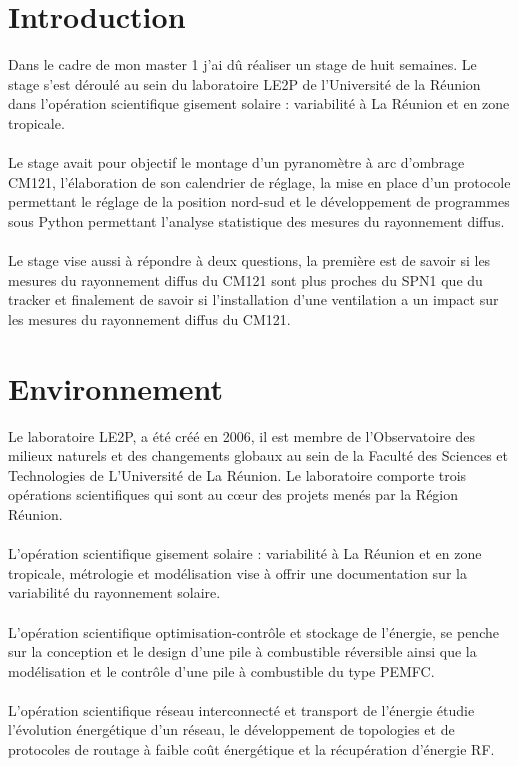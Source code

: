 \documentclass[12pt,a4paper]{article}
\begin{document}
\begin{flushleft}

\justify
\sf
\section{Introduction}

\setcounter{page}{1}

Dans le cadre de mon master 1 j'ai dû réaliser un stage de huit semaines. Le stage s'est déroulé au sein du laboratoire LE2P de l'Université de la Réunion dans l'opération scientifique gisement solaire : variabilité à La Réunion et en zone tropicale.\\
~\\
Le stage avait pour objectif le montage d'un pyranomètre à arc d'ombrage CM121, l'élaboration de son calendrier de réglage, la mise en place d'un protocole permettant le réglage de la position nord-sud et le développement de programmes sous Python permettant l'analyse statistique des mesures du rayonnement diffus.\\
~\\
 Le stage vise aussi à répondre à deux questions, la première est de savoir si les mesures du rayonnement diffus du CM121 sont plus proches  du SPN1 que du tracker et finalement de savoir si l'installation d'une ventilation a un impact sur les mesures du rayonnement diffus du CM121.
 

\section{Environnement}



Le laboratoire LE2P, a été créé en 2006,  il est membre de l’Observatoire des milieux naturels et des changements globaux au sein de la Faculté des Sciences et Technologies de L’Université de La Réunion. Le laboratoire comporte trois opérations scientifiques qui sont au cœur des projets menés par la Région Réunion.\\
~\\
L'opération scientifique gisement solaire : variabilité à La Réunion et en zone tropicale, métrologie et modélisation  vise à offrir une documentation sur la variabilité du rayonnement solaire.\\
~\\
L'opération scientifique optimisation-contrôle et stockage de l'énergie, se penche sur la conception et le design d’une pile à combustible réversible ainsi que la modélisation et le contrôle d’une pile à combustible du type PEMFC.\\ 
~\\
L'opération scientifique réseau interconnecté et transport de l'énergie étudie l’évolution énergétique d'un réseau, le développement de topologies et de protocoles de routage à faible coût énergétique et la récupération d’énergie RF.
~\\



\end{flushleft}
\end{document}
